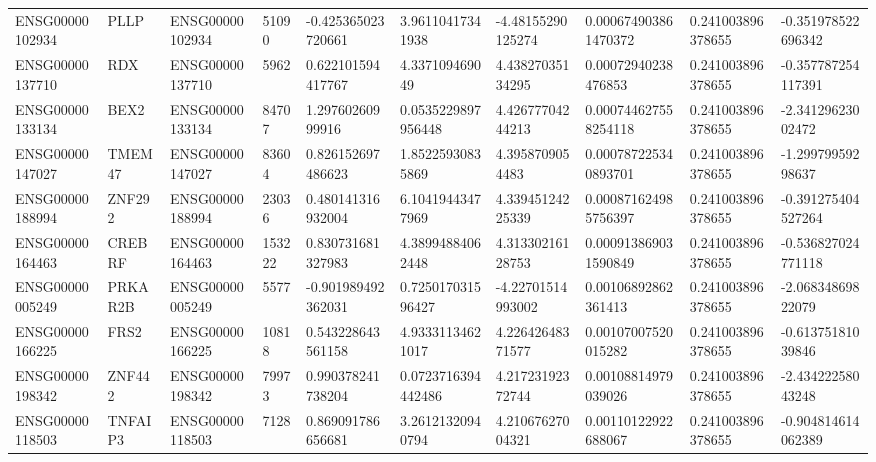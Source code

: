 \begin{tabular}{@{}llllllllll@{}}
ENSG00000102934 & PLLP & ENSG00000102934 & 51090 & -0.425365023720661 & 3.96110417341938 & -4.48155290125274 & 0.000674903861470372 & 0.241003896378655 & -0.351978522696342 \\
ENSG00000137710 & RDX & ENSG00000137710 & 5962 & 0.622101594417767 & 4.337109469049 & 4.43827035134295 & 0.00072940238476853 & 0.241003896378655 & -0.357787254117391 \\
ENSG00000133134 & BEX2 & ENSG00000133134 & 84707 & 1.29760260999916 & 0.0535229897956448 & 4.42677704244213 & 0.000744627558254118 & 0.241003896378655 & -2.34129623002472 \\
ENSG00000147027 & TMEM47 & ENSG00000147027 & 83604 & 0.826152697486623 & 1.85225930835869 & 4.3958709054483 & 0.000787225340893701 & 0.241003896378655 & -1.29979959298637 \\
ENSG00000188994 & ZNF292 & ENSG00000188994 & 23036 & 0.480141316932004 & 6.10419443477969 & 4.33945124225339 & 0.000871624985756397 & 0.241003896378655 & -0.391275404527264 \\
ENSG00000164463 & CREBRF & ENSG00000164463 & 153222 & 0.830731681327983 & 4.38994884062448 & 4.31330216128753 & 0.000913869031590849 & 0.241003896378655 & -0.536827024771118 \\
ENSG00000005249 & PRKAR2B & ENSG00000005249 & 5577 & -0.901989492362031 & 0.725017031596427 & -4.22701514993002 & 0.00106892862361413 & 0.241003896378655 & -2.06834869822079 \\
ENSG00000166225 & FRS2 & ENSG00000166225 & 10818 & 0.543228643561158 & 4.93331134621017 & 4.22642648371577 & 0.00107007520015282 & 0.241003896378655 & -0.61375181039846 \\
ENSG00000198342 & ZNF442 & ENSG00000198342 & 79973 & 0.990378241738204 & 0.0723716394442486 & 4.21723192372744 & 0.00108814979039026 & 0.241003896378655 & -2.43422258043248 \\
ENSG00000118503 & TNFAIP3 & ENSG00000118503 & 7128 & 0.869091786656681 & 3.26121320940794 & 4.21067627004321 & 0.00110122922688067 & 0.241003896378655 & -0.904814614062389 \\
\bottomrule
\end{tabular}
\endgroup
